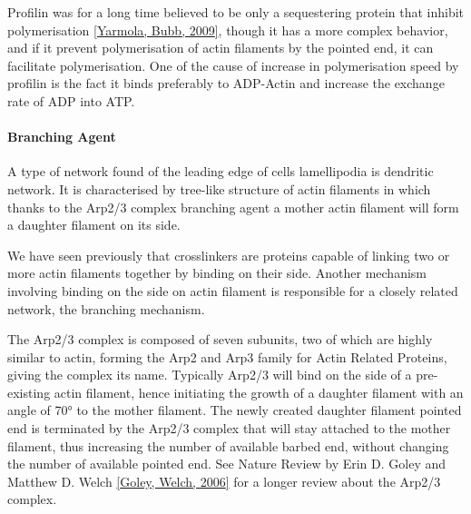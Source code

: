 \documentclass[A4paperpaper,11pt,english]{sphinxmanual}
\begin{document}
Profilin was for a long time believed to be only a sequestering protein
that inhibit polymerisation {\hyperref[index-latex:yarmola2009]{{[}Yarmola, Bubb,  2009{]}}}, though it has a more complex
behavior, and if it prevent polymerisation of actin filaments by the pointed
end, it can facilitate polymerisation. One of the cause of increase in
polymerisation speed by profilin is the fact it binds preferably to ADP-Actin
and increase the exchange rate of ADP into ATP.


\paragraph{Branching Agent}
\label{index-latex:branching-agent}
A type of network found of the leading edge of cells lamellipodia is dendritic
network. It is characterised by tree-like structure of actin filaments in which
thanks to the Arp2/3 complex branching agent a mother actin filament will form a
daughter filament on its side.

We have seen previously that crosslinkers are proteins capable of linking two
or more actin filaments together by binding on their side. Another mechanism
involving binding on the side on actin filament is responsible for a closely
related network, the branching mechanism.

The Arp2/3 complex is composed of seven subunits, two of which are highly
similar to actin, forming the Arp2 and Arp3 family for Actin Related Proteins,
giving the complex its name. Typically Arp2/3 will bind on the side of a pre-existing
actin filament, hence initiating the growth of a daughter filament with an angle of
70° to the mother filament. The newly created daughter filament pointed end
is terminated by the Arp2/3 complex that will stay attached to the mother
filament, thus increasing the number of available barbed end, without changing
the number of available pointed end. See Nature Review by Erin D. Goley and
Matthew D. Welch {\hyperref[index-latex:goley2006]{{[}Goley, Welch,  2006{]}}} for  a longer review about the Arp2/3
complex.
\end{document}
